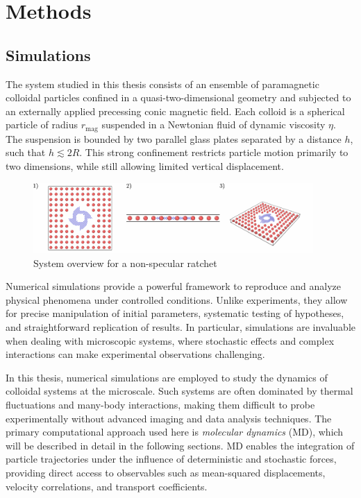 \part{Methods}
\label{part:methods}

\chapter{Simulations}

The system studied in this thesis consists of an ensemble of paramagnetic colloidal particles confined in a quasi-two-dimensional geometry and subjected to an externally applied precessing conic magnetic field. Each colloid is a spherical particle of radius $r_{\mathrm{mag}}$ suspended in a Newtonian fluid of dynamic viscosity $\eta$. The suspension is bounded by two parallel glass plates separated by a distance $h$, such that $h \lesssim 2R$. This strong confinement restricts particle motion primarily to two dimensions, while still allowing limited vertical displacement. 

\begin{figure}
  \begin{center}
    \includegraphics[width=0.95\textwidth]{figures/system.pdf}
  \end{center}
  \caption[System overview.]{System overview for a non-specular ratchet}\label{fig:system}
\end{figure}


Numerical simulations provide a powerful framework to reproduce and analyze physical phenomena under controlled conditions. Unlike experiments, they allow for precise manipulation of initial parameters, systematic testing of hypotheses, and straightforward replication of results. In particular, simulations are invaluable when dealing with microscopic systems, where stochastic effects and complex interactions can make experimental observations challenging. 

In this thesis, numerical simulations are employed to study the dynamics of colloidal systems at the microscale. Such systems are often dominated by thermal fluctuations and many-body interactions, making them difficult to probe experimentally without advanced imaging and data analysis techniques. The primary computational approach used here is \textit{molecular dynamics} (MD), which will be described in detail in the following sections. MD enables the integration of particle trajectories under the influence of deterministic and stochastic forces, providing direct access to observables such as mean-squared displacements, velocity correlations, and transport coefficients.

